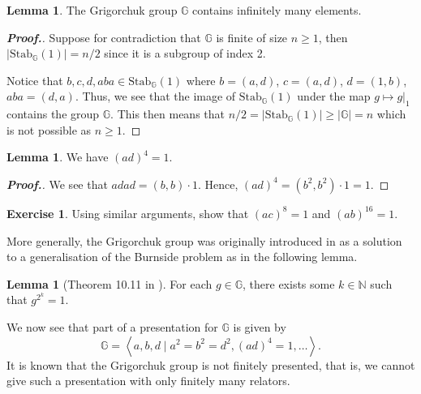 \documentclass[11pt,a4paper,reqno]{amsart}
\theoremstyle{plain}
\theoremstyle{definition}
\newtheorem{lemma}[theorem]{Lemma}
\theoremstyle{definition}
\newtheorem{exercise}[theorem]{Exercise}
\newenvironment{myproof}{\begin{proof}[\normalfont\bfseries Proof.]}{\end{proof}}
\renewcommand\geq\geqslant
\begin{document}
\begin{lemma}\label{lem:infinite}
  The Grigorchuk group $\mathbb G$ contains infinitely many elements.
\end{lemma}

\begin{myproof}
  Suppose for contradiction that $\mathbb{G}$ is finite of size $n\geq 1$, then $|\mathrm{Stab}_{\mathbb G}(1)| = n/2$ since it is a subgroup of index 2.

  Notice that $b,c,d,aba \in \mathrm{Stab}_{\mathbb G}(1)$ where $b=(a,d)$, $c=(a,d)$, $d= (1,b)$, $aba=(d,a)$.
  Thus, we see that the image of $\mathrm{Stab}_{\mathbb G}(1)$ under the map $g\mapsto g|_1$ contains the group $\mathbb G$.
  This then means that $n/2=|\mathrm{Stab}_{\mathbb G}(1)|\geq |\mathbb G|=n$ which is not possible as $n\geq 1$.
\end{myproof}



\begin{lemma}
  We have $(ad)^4=1$.
\end{lemma}
\begin{myproof}
  We see that $adad = (b,b)\cdot 1$.
  Hence, $(ad)^4 = (b^2, b^2)\cdot 1 = 1$.
\end{myproof}

\begin{exercise}
  Using similar arguments, show that $(ac)^8=1$ and $(ab)^{16}=1$.
\end{exercise}

More generally, the Grigorchuk group was originally introduced in \cite{GrigorchukBurnside} as a solution to a generalisation of the Burnside problem as in the following lemma.

\begin{lemma}[Theorem 10.11 in \cite{Mann}]
  For each $g\in \mathbb G$, there exists some $k\in \mathbb N$ such that $g^{2^k}=1$.
\end{lemma}


We now see that part of a presentation for $\mathbb G$ is given by
\[
  \mathbb G
  =
  \left\langle
    a,b,d
  \mid
    a^2=b^2=d^2, (ad)^4=1,\ldots
  \right\rangle.
\]
It is known that the Grigorchuk group is not finitely presented, that is, we cannot give such a presentation with only finitely many relators.
\end{document}
